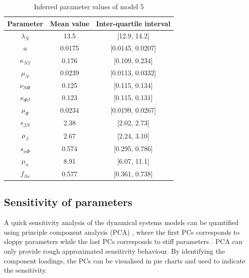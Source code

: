 \begin{table}[H]
    \centering
    \begin{tabular}{|c c c|}
        \hline
        Parameter            & Mean value & Inter-quartile interval \\[0.5ex]
        \hline\hline
        $\lambda_N$          & 13.5       & [12.9, 14.2]            \\
        $a$                  & 0.0175     & [0.0145, 0.0207]        \\
        $\kappa_{N\beta}$    & 0.176      & [0.109, 0.234]          \\
        $\mu_N$              & 0.0239     & [0.0113, 0.0332]        \\
        $\nu_{N\Phi}$        & 0.125      & [0.115, 0.134]          \\
        \hline
        $\kappa_{\Phi\beta}$ & 0.123      & [0.115, 0.131]          \\
        $\mu_\Phi$           & 0.0234     & [0.0199, 0.0267]        \\
        \hline
        $s_{\beta N}$        & 2.38       & [2.02, 2.73]            \\
        $\mu_\beta$          & 2.67       & [2.24, 3.10]            \\
        \hline
        $s_{\alpha\Phi}$     & 0.574      & [0.295, 0.786]          \\
        $\mu_\alpha$         & 8.91       & [6.07, 11.1]            \\
        $f_{\beta\alpha}$    & 0.577      & [0.361, 0.738]          \\
        \hline
    \end{tabular}
    \caption[Inferred parameter values of model 5]
    {Inferred parameter values of model 5}
    \label{table:estimated5}
\end{table}


\subsection{Sensitivity of parameters}





A quick sensitivity analysis of the dynamical systems models can be quantified using principle component analysis (PCA) \cite{Toni}, where the first PCs corresponds to sloppy parameters while the last PCs corresponds to stiff parameters \cite{sensitivity}. PCA can only provide rough approximated sensitivity behaviour. By identifying the component loadings, the PCs can be visualised in pie charts and used to indicate the sensitivity. 

